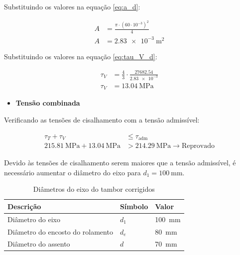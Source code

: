 \vspace{1em}

Substituindo os valores na equação \eqref{eq:a_d}:

\begin{align*}
  A & = \frac{\pi \cdot {\left( 60 \cdot 10^{-3} \right)}^2}{4} \\
  A & = \boxed{\SI{2.83e-3}{\meter^2}}
\end{align*}

Substituindo os valores na equação \eqref{eq:tau_V_d}:

\begin{align*}
  \tau_V & = \frac{4}{3} \cdot \frac{\num{27682.54}}{\num{2.83e-3}} \\
  \tau_V & = \boxed{\SI{13.04}{\mega\pascal}}
\end{align*}

\begin{itemize}
  \item \textbf{Tensão combinada}
\end{itemize}

Verificando as tensões de cisalhamento com a tensão admissível:

\begin{align*}
  \tau_T + \tau_V                                      & \leq \tau_{\text{adm}}                                   \\
  \SI{215.81}{\mega\pascal} + \SI{13.04}{\mega\pascal} & > \SI{214.29}{\mega\pascal} \rightarrow \text{Reprovado}
\end{align*}

Devido às tensões de cisalhamento serem maiores que a tensão admissível, é necessário aumentar o diâmetro do eixo para $d_1 = \SI{100}{\milli\meter}$.

\begin{table}[H]
  \centering
  \caption{Diâmetros do eixo do tambor corrigidos}
  \label{tab:diametros_eixo_do_tambor_corrigidos}
  \begin{tabularx}{\textwidth}{>{\centering\arraybackslash}X>{\centering\arraybackslash}X>{\centering\arraybackslash}X}
    \toprule
    Descrição                        & Símbolo & Valor                  \\
    \midrule
    Diâmetro do eixo                 & $d_1$   & \SI{100}{\milli\meter} \\
    Diâmetro do encosto do rolamento & $d_e$   & \SI{80}{\milli\meter}  \\
    Diâmetro do assento              & $d$     & \SI{70}{\milli\meter}  \\
    \bottomrule
  \end{tabularx}
\end{table}

